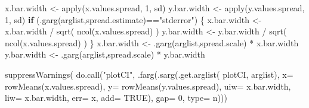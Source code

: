\documentclass[
  letterpaper,
  DIV=11,
  numbers=noendperiod]{scrartcl}
\newenvironment{Shaded}{\begin{snugshade}}{\end{snugshade}}
\newcommand{\AttributeTok}[1]{\textcolor[rgb]{0.40,0.45,0.13}{#1}}
\newcommand{\ConstantTok}[1]{\textcolor[rgb]{0.56,0.35,0.01}{#1}}
\newcommand{\ControlFlowTok}[1]{\textcolor[rgb]{0.00,0.23,0.31}{\textbf{#1}}}
\newcommand{\DecValTok}[1]{\textcolor[rgb]{0.68,0.00,0.00}{#1}}
\newcommand{\FunctionTok}[1]{\textcolor[rgb]{0.28,0.35,0.67}{#1}}
\newcommand{\NormalTok}[1]{\textcolor[rgb]{0.00,0.23,0.31}{#1}}
\newcommand{\OtherTok}[1]{\textcolor[rgb]{0.00,0.23,0.31}{#1}}
\newcommand{\SpecialCharTok}[1]{\textcolor[rgb]{0.37,0.37,0.37}{#1}}
\newcommand{\StringTok}[1]{\textcolor[rgb]{0.13,0.47,0.30}{#1}}
\begin{document}
\begin{Shaded}
\begin{Highlighting}[]
\NormalTok{        x.bar.width }\OtherTok{\textless{}{-}} \FunctionTok{apply}\NormalTok{(x.values.spread, }\DecValTok{1}\NormalTok{, sd)}
\NormalTok{        y.bar.width }\OtherTok{\textless{}{-}} \FunctionTok{apply}\NormalTok{(y.values.spread, }\DecValTok{1}\NormalTok{, sd)}
        \ControlFlowTok{if}\NormalTok{ (}\FunctionTok{.garg}\NormalTok{(arglist,}\StringTok{\textquotesingle{}spread.estimate\textquotesingle{}}\NormalTok{)}\SpecialCharTok{==}\StringTok{"stderror"}\NormalTok{) \{}
\NormalTok{            x.bar.width }\OtherTok{\textless{}{-}}\NormalTok{ x.bar.width }\SpecialCharTok{/} \FunctionTok{sqrt}\NormalTok{( }\FunctionTok{ncol}\NormalTok{(x.values.spread) )}
\NormalTok{            y.bar.width }\OtherTok{\textless{}{-}}\NormalTok{ y.bar.width }\SpecialCharTok{/} \FunctionTok{sqrt}\NormalTok{( }\FunctionTok{ncol}\NormalTok{(x.values.spread) )}
\NormalTok{        \}}
\NormalTok{        x.bar.width }\OtherTok{\textless{}{-}} \FunctionTok{.garg}\NormalTok{(arglist,}\StringTok{\textquotesingle{}spread.scale\textquotesingle{}}\NormalTok{) }\SpecialCharTok{*}\NormalTok{ x.bar.width}
\NormalTok{        y.bar.width }\OtherTok{\textless{}{-}} \FunctionTok{.garg}\NormalTok{(arglist,}\StringTok{\textquotesingle{}spread.scale\textquotesingle{}}\NormalTok{) }\SpecialCharTok{*}\NormalTok{ y.bar.width}

        \FunctionTok{suppressWarnings}\NormalTok{( }\FunctionTok{do.call}\NormalTok{(}\StringTok{"plotCI"}\NormalTok{,}
                                  \FunctionTok{.farg}\NormalTok{(}\FunctionTok{.sarg}\NormalTok{(}\FunctionTok{.get.arglist}\NormalTok{( }\StringTok{\textquotesingle{}plotCI\textquotesingle{}}\NormalTok{, arglist),}
                                              \AttributeTok{x=} \FunctionTok{rowMeans}\NormalTok{(x.values.spread),}
                                              \AttributeTok{y=} \FunctionTok{rowMeans}\NormalTok{(y.values.spread),}
                                              \AttributeTok{uiw=}\NormalTok{ x.bar.width,}
                                              \AttributeTok{liw=}\NormalTok{ x.bar.width,}
                                              \AttributeTok{err=} \StringTok{\textquotesingle{}x\textquotesingle{}}\NormalTok{,}
                                              \AttributeTok{add=} \ConstantTok{TRUE}\NormalTok{),}
                                        \AttributeTok{gap=} \DecValTok{0}\NormalTok{,}
                                        \AttributeTok{type=} \StringTok{\textquotesingle{}n\textquotesingle{}}\NormalTok{)))}
        

\end{Highlighting}
\end{Shaded}
\end{document}
